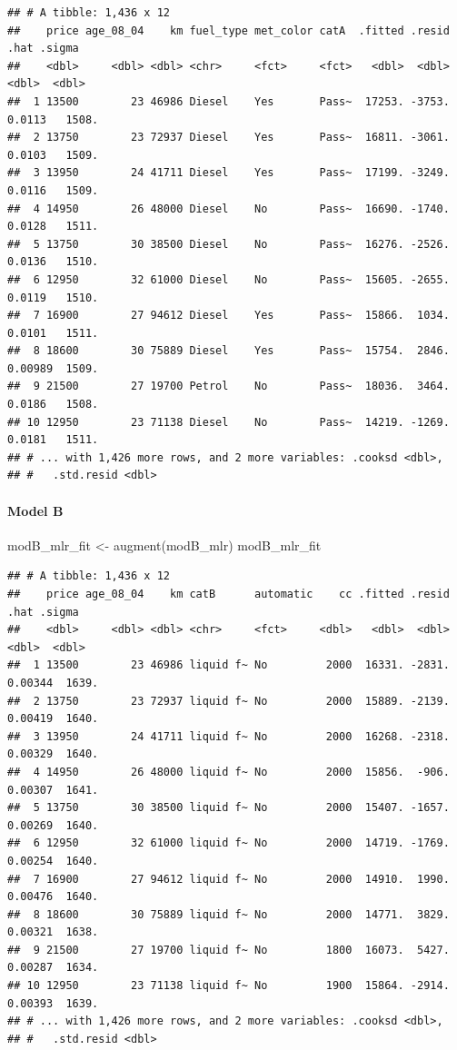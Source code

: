 \documentclass[
]{article}
\newenvironment{Shaded}{\begin{snugshade}}{\end{snugshade}}
\newcommand{\FunctionTok}[1]{\textcolor[rgb]{0.00,0.00,0.00}{#1}}
\newcommand{\NormalTok}[1]{#1}
\newcommand{\OtherTok}[1]{\textcolor[rgb]{0.56,0.35,0.01}{#1}}
\begin{document}
\begin{verbatim}
## # A tibble: 1,436 x 12
##    price age_08_04    km fuel_type met_color catA  .fitted .resid    .hat .sigma
##    <dbl>     <dbl> <dbl> <chr>     <fct>     <fct>   <dbl>  <dbl>   <dbl>  <dbl>
##  1 13500        23 46986 Diesel    Yes       Pass~  17253. -3753. 0.0113   1508.
##  2 13750        23 72937 Diesel    Yes       Pass~  16811. -3061. 0.0103   1509.
##  3 13950        24 41711 Diesel    Yes       Pass~  17199. -3249. 0.0116   1509.
##  4 14950        26 48000 Diesel    No        Pass~  16690. -1740. 0.0128   1511.
##  5 13750        30 38500 Diesel    No        Pass~  16276. -2526. 0.0136   1510.
##  6 12950        32 61000 Diesel    No        Pass~  15605. -2655. 0.0119   1510.
##  7 16900        27 94612 Diesel    Yes       Pass~  15866.  1034. 0.0101   1511.
##  8 18600        30 75889 Diesel    Yes       Pass~  15754.  2846. 0.00989  1509.
##  9 21500        27 19700 Petrol    No        Pass~  18036.  3464. 0.0186   1508.
## 10 12950        23 71138 Diesel    No        Pass~  14219. -1269. 0.0181   1511.
## # ... with 1,426 more rows, and 2 more variables: .cooksd <dbl>,
## #   .std.resid <dbl>
\end{verbatim}

\hypertarget{model-b-10}{%
\paragraph{Model B}\label{model-b-10}}

\begin{Shaded}
\begin{Highlighting}[]
\NormalTok{modB\_mlr\_fit }\OtherTok{\textless{}{-}} \FunctionTok{augment}\NormalTok{(modB\_mlr)}
\NormalTok{modB\_mlr\_fit}
\end{Highlighting}
\end{Shaded}

\begin{verbatim}
## # A tibble: 1,436 x 12
##    price age_08_04    km catB      automatic    cc .fitted .resid    .hat .sigma
##    <dbl>     <dbl> <dbl> <chr>     <fct>     <dbl>   <dbl>  <dbl>   <dbl>  <dbl>
##  1 13500        23 46986 liquid f~ No         2000  16331. -2831. 0.00344  1639.
##  2 13750        23 72937 liquid f~ No         2000  15889. -2139. 0.00419  1640.
##  3 13950        24 41711 liquid f~ No         2000  16268. -2318. 0.00329  1640.
##  4 14950        26 48000 liquid f~ No         2000  15856.  -906. 0.00307  1641.
##  5 13750        30 38500 liquid f~ No         2000  15407. -1657. 0.00269  1640.
##  6 12950        32 61000 liquid f~ No         2000  14719. -1769. 0.00254  1640.
##  7 16900        27 94612 liquid f~ No         2000  14910.  1990. 0.00476  1640.
##  8 18600        30 75889 liquid f~ No         2000  14771.  3829. 0.00321  1638.
##  9 21500        27 19700 liquid f~ No         1800  16073.  5427. 0.00287  1634.
## 10 12950        23 71138 liquid f~ No         1900  15864. -2914. 0.00393  1639.
## # ... with 1,426 more rows, and 2 more variables: .cooksd <dbl>,
## #   .std.resid <dbl>
\end{verbatim}
\end{document}
